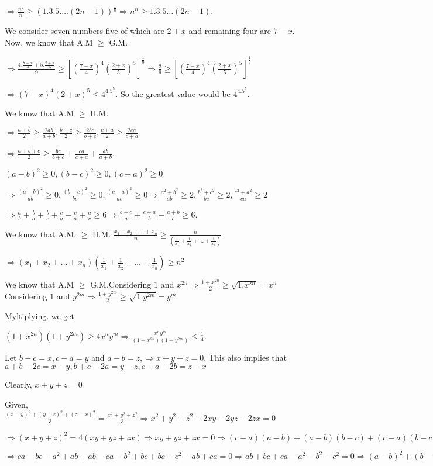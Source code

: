   $\Rightarrow \frac{n^2}{n}\geq (1.3.5.\ldots(2n - 1))^{\frac{1}{n}} \Rightarrow n^n \geq 1.3.5\ldots (2n - 1)$.
\item We consider seven numbers five of which are $2 + x$ and remaining four are $7 - x.$ Now, we know that A.M
  $\geq$ G.M.

  $\Rightarrow \frac{4.\frac{7 - x}{4} + 5.\frac{2 + x}{5}}{9}\geq \left[\left(\frac{7 - x}{4}\right)^4\left(\frac{2 +
    x}{5}\right)^5\right]^{\frac{1}{9}} \Rightarrow \frac{9}{9}\geq \left[\left(\frac{7 -
    x}{4}\right)^4\left(\frac{2 + x}{5}\right)^5\right]^{\frac{1}{9}}$

  $\Rightarrow (7 - x)^4(2 + x)^5 \leq 4^4.5^5$. So the greatest value would be $4^4.5^5$.
\item We know that A.M $\geq$ H.M.

  $\Rightarrow \frac{a + b}{2}\geq \frac{2ab}{a + b}, \frac{b + c}{2}\geq \frac{2bc}{b + c}, \frac{c + a}{2}\geq
  \frac{2ca}{c + a}$

  $\Rightarrow \frac{a + b + c}{2}\geq \frac{bc}{b + c} + \frac{ca}{c + a} + \frac{ab}{a + b}$.
\item $(a - b)^2 \geq 0, (b - c)^2\geq 0, (c - a)^2\geq 0$

  $\Rightarrow \frac{(a - b)^2}{ab}\geq 0, \frac{(b - c)^2}{bc}\geq 0, \frac{(c - a)^2}{ac}\geq 0
  \Rightarrow \frac{a^2 + b^2}{ab}\geq 2, \frac{b^2 + c^2}{bc}\geq 2, \frac{c^2 + a^2}{ca}\geq 2$

  $\Rightarrow \frac{a}{b} + \frac{b}{a} + \frac{b}{c} + \frac{c}{b} + \frac{c}{a} + \frac{a}{c}\geq
  6\Rightarrow \frac{b + c}{a} + \frac{c + a}{b} + \frac{a + b}{c}\geq 6$.
\item We know that A.M. $\geq$ H.M.
  $\frac{x_1 + x_2 + \ldots + x_n}{n}\geq \frac{n}{\left(\frac{1}{x_1} + \frac{1}{x_2} + \ldots +
  \frac{1}{x_n}\right)}$

  $\Rightarrow (x_1 + x_2 + \ldots + x_n)\left(\frac{1}{x_1} + \frac{1}{x_2} +
  \ldots + \frac{1}{x_n}\right) \geq n^2$
\item We know that A.M $\geq$ G.M.Considering $1$ and $x^{2n}\Rightarrow \frac{1 + x^{2n}}{2}\geq \sqrt{1.x^{2n}} = x^n$
  Considering $1$ and $y^{2m}\Rightarrow \frac{1 + y^{2m}}{2}\geq \sqrt{1.y^{2m}} = y^m$

  Myltiplying. we get

  $(1 + x^{2n})(1 + y^{2m})\geq 4x^ny^m\Rightarrow \frac{x^ny^m}{(1 + x^{2n})(1 + y^{2m})}\leq \frac{1}{4}$.
\item Let $b - c = x, c - a = y$ and $a - b = z,\Rightarrow x + y + z = 0.$ This also implies that $a + b - 2c = x -
  y, b + c - 2a = y - z, c + a - 2b = z - x$

  Clearly, $x + y + z = 0$

  Given, $\frac{(x - y)^2 + (y - z)^2 + (z - x)^2}{3} = \frac{x^2 + y^2 + z^2}{3} \Rightarrow x^2 + y^2 +
  z^2 - 2xy - 2yz - 2zx = 0$

  $\Rightarrow (x + y + z)^2 = 4(xy + yz + zx)\Rightarrow xy + yz + zx = 0\Rightarrow (c - a)(a - b) + (a -
  b)(b - c) + (c - a)(b - c) = 0$

  $\Rightarrow ca - bc - a^2 + ab + ab - ca - b^2 + bc + bc - c^2 - ab + ca = 0\Rightarrow ab + bc + ca -
  a^2 - b^2 - c^2 = 0\Rightarrow (a - b)^2 + (b - c)^2 + (c - a)^2 = 0\Rightarrow a = b = c$
\stopitemize
